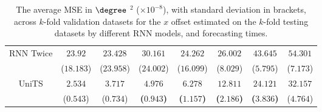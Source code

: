 \begin{table}[!ht]
{\begin{tabular}{|c|c|c|c|c|c|c|c|}
			\multirow{2}{*}{RNN Twice} & $23.92$ & $23.428$ & $30.161$ & $24.262$ & $26.002$ & $43.645$ & $54.301$ \\
			 & ($18.183$) & ($23.958$) & ($24.002$) & ($16.099$) & ($8.029$) & ($5.795$) & ($7.173$) \\ \hline
			\multirow{2}{*}{UniTS} & $2.534$ & $3.717$ & $\mathbf{4.976}$ & $\mathbf{6.278}$ & $\mathbf{12.811}$ & $\mathbf{24.121}$ & $32.157$ \\
			 & ($0.543$) & ($0.734$) & \textbf{(}$\mathbf{0.943}$\textbf{)} & \textbf{(}$\mathbf{1.157}$\textbf{)} & \textbf{(}$\mathbf{2.186}$\textbf{)} & \textbf{(}$\mathbf{3.836}$\textbf{)} & ($4.764$) \\ \hline
		\end{tabular}
	}
	\caption{The average MSE in $\degree$ $^{2}$ ($\times 10^{-8}$), with standard deviation in brackets, across $k$-fold validation datasets for the $x$ offset estimated on the $k$-fold testing datasets by different RNN models, and forecasting times.}
	\label{tab:all_longitude_no_abs_MSE}
\end{table}

